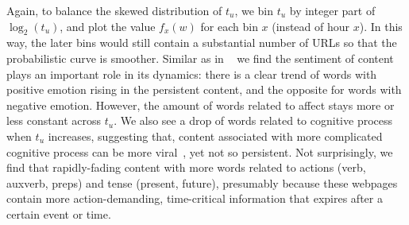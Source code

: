 \documentclass[phd,tocprelim]{cornell}
\renewcommand{\caption}[1]{\singlespacing\hangcaption{#1}\normalspacing}
\begin{document}
\begin{figure}[htb!]
 \centering
 \caption{Trending LIWC categories}
 \label{fig:liwc-trend}
\end{figure}

Again, to balance the skewed distribution of $t_u$, we bin $t_u$ by integer part of $\log_2(t_u)$, and plot the value $f_x(w)$ for each bin $x$ (instead of hour $x$). In this way, the later bins would still contain a substantial number of URLs so that the probabilistic curve is smoother. Similar as in ~\cite{Berger-2010,Hansen:11} we find the sentiment of content plays an important role in its dynamics: there is a clear trend of words with positive emotion rising in the persistent content, and the opposite for words with negative emotion. However, the amount of words related to affect stays more or less constant across $t_u$. We also see a drop of words related to cognitive process  when $t_u$ increases, suggesting that, content associated with more complicated cognitive process can be more viral~\cite{Berger-2010}, yet not so persistent. Not surprisingly, we find that rapidly-fading content with more words related to actions (verb, auxverb, preps) and tense (present, future), presumably because these webpages contain more action-demanding, time-critical information that expires after a certain event or time.





\end{document}
